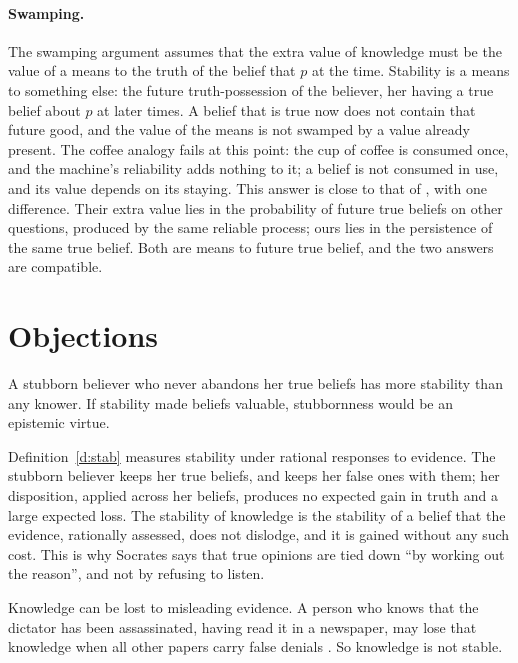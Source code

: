 \documentclass{situationist-preprint}
\begin{document}
\paragraph{Swamping.} The swamping argument assumes that the extra value of knowledge must be the value of a means to the truth of the belief that $p$ at the time. Stability is a means to something else: the future truth-possession of the believer, her having a true belief about $p$ at later times. A belief that is true now does not contain that future good, and the value of the means is not swamped by a value already present. The coffee analogy fails at this point: the cup of coffee is consumed once, and the machine's reliability adds nothing to it; a belief is not consumed in use, and its value depends on its staying. This answer is close to that of \citet{GoldmanOlsson2009}, with one difference. Their extra value lies in the probability of future true beliefs on other questions, produced by the same reliable process; ours lies in the persistence of the same true belief. Both are means to future true belief, and the two answers are compatible.

\section{Objections}

\begin{objection}[Stubbornness]
A stubborn believer who never abandons her true beliefs has more stability than any knower. If stability made beliefs valuable, stubbornness would be an epistemic virtue.
\end{objection}

\begin{reply}
Definition~\ref{d:stab} measures stability under rational responses to evidence. The stubborn believer keeps her true beliefs, and keeps her false ones with them; her disposition, applied across her beliefs, produces no expected gain in truth and a large expected loss. The stability of knowledge is the stability of a belief that the evidence, rationally assessed, does not dislodge, and it is gained without any such cost. This is why Socrates says that true opinions are tied down \enquote{by working out the reason}, and not by refusing to listen.
\end{reply}

\begin{objection}
Knowledge can be lost to misleading evidence. A person who knows that the dictator has been assassinated, having read it in a newspaper, may lose that knowledge when all other papers carry false denials \citep{Harman1973}. So knowledge is not stable.
\end{objection}
\end{document}
